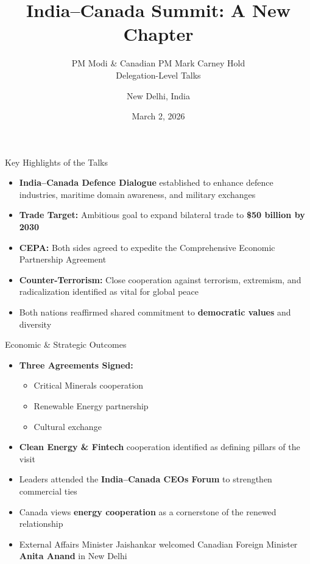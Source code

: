 \documentclass{beamer}
\title{India--Canada Summit: A New Chapter}
\subtitle{PM Modi \& Canadian PM Mark Carney Hold\\Delegation-Level Talks}
\author{New Delhi, India}
\date{March 2, 2026}
\institute{Hyderabad House, New Delhi}
\begin{document}
\begin{frame}
  \titlepage
\end{frame}

\begin{frame}{Key Highlights of the Talks}
  \begin{itemize}
    \item \textbf{India--Canada Defence Dialogue} established to enhance defence industries, maritime domain awareness, and military exchanges
    \item \textbf{Trade Target:} Ambitious goal to expand bilateral trade to \textbf{\$50 billion by 2030}
    \item \textbf{CEPA:} Both sides agreed to expedite the Comprehensive Economic Partnership Agreement
    \item \textbf{Counter-Terrorism:} Close cooperation against terrorism, extremism, and radicalization identified as vital for global peace
    \item Both nations reaffirmed shared commitment to \textbf{democratic values} and diversity
  \end{itemize}
\end{frame}

\begin{frame}{Economic \& Strategic Outcomes}
  \begin{itemize}
    \item \textbf{Three Agreements Signed:}
      \begin{itemize}
        \item Critical Minerals cooperation
        \item Renewable Energy partnership
        \item Cultural exchange
      \end{itemize}
    \item \textbf{Clean Energy \& Fintech} cooperation identified as defining pillars of the visit
    \item Leaders attended the \textbf{India--Canada CEOs Forum} to strengthen commercial ties
    \item Canada views \textbf{energy cooperation} as a cornerstone of the renewed relationship
    \item External Affairs Minister Jaishankar welcomed Canadian Foreign Minister \textbf{Anita Anand} in New Delhi
  \end{itemize}
\end{frame}
\end{document}
